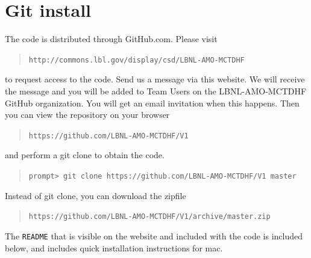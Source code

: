 \documentclass[10pt,leqno, oneside]{book}
\begin{document}
\section{Git install}

The code is distributed through GitHub.com.
Please visit 
\begin{quote}
    \verb#http://commons.lbl.gov/display/csd/LBNL-AMO-MCTDHF#
\end{quote}
to request access to the code.
Send us a message via this website.   We will receive the message and 
you will be added to Team Users on the LBNL-AMO-MCTDHF GitHub organization.  You will get an
email invitation when this happens.
%
Then you can view the repository on your browser
\begin{quote}
    \verb#https://github.com/LBNL-AMO-MCTDHF/V1#
\end{quote}
and perform a git clone to obtain the code.
\begin{quote} 
    \verb#prompt> git clone https://github.com/LBNL-AMO-MCTDHF/V1 master#
\end{quote}
%
Instead of git clone, you can download the zipfile
%
\begin{quote} 
    \verb#https://github.com/LBNL-AMO-MCTDHF/V1/archive/master.zip#
\end{quote}
The \verb#README# that is visible on the website and included with the code is included below, and includes quick installation
instructions for mac.



\end{document}
